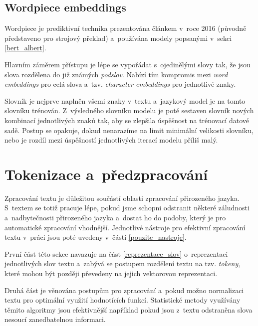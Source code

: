 \subsection{Wordpiece embeddings}
\label{wordpiece_embb}
Wordpiece je prediktivní technika prezentována článkem \cite{wordpiece} v~roce 2016 (původně představeno pro strojový překlad) a~používána modely popsanými v~sekci \ref{bert_albert}.\par
Hlavním záměrem přístupu je lépe se vypořádat s~ojedinělými slovy tak, že jsou slova rozdělena do již známých \emph{podslov}. Nabízí tím kompromis mezi \emph{word embeddings} pro celá slova a~tzv. \emph{character embeddings} pro jednotlivé znaky.\par
Slovník je nejprve naplněn všemi znaky v~textu a~jazykový model je na tomto slovníku trénován. Z~výsledného slovníku modelu je poté sestaven slovník nových kombinací jednotlivých znaků tak, aby se zlepšila úspěšnost na trénovací datové sadě. Postup se opakuje, dokud nenarazíme na limit minimální velikosti slovníku, nebo je rozdíl mezi úspěšností jednotlivých iterací modelu příliš malý.

\section{Tokenizace a~předzpracování}
\label{preprocessing}
Zpracování textu je důležitou součástí oblasti zpracování přirozeného jazyka. S~textem se totiž pracuje lépe, pokud jsme schopni odstranit některé záludnosti a~nadbytečnosti přirozeného jazyka a~dostat ho do podoby, který je pro automatické zpracování vhodnější. Jednotlivé nástroje pro efektivní zpracování textu v~práci jsou poté uvedeny v~části \ref{pouzite_nastroje}.\par
První část této sekce navazuje na část \ref{reprezentace_slov} o~reprezentaci jednotlivých slov textu a~zabývá se postupem rozdělení textu na tzv. \emph{tokeny}, které mohou být později převedeny na jejich vektorovou reprezentaci.\par
Druhá část je věnována postupům pro zpracování a~pokud možno normalizaci textu pro optimální využití hodnotících funkcí. Statistické metody využívány těmito algoritmy jsou efektivnější například pokud jsou z~textu odstraněna slova nesoucí zanedbatelnou informaci.

